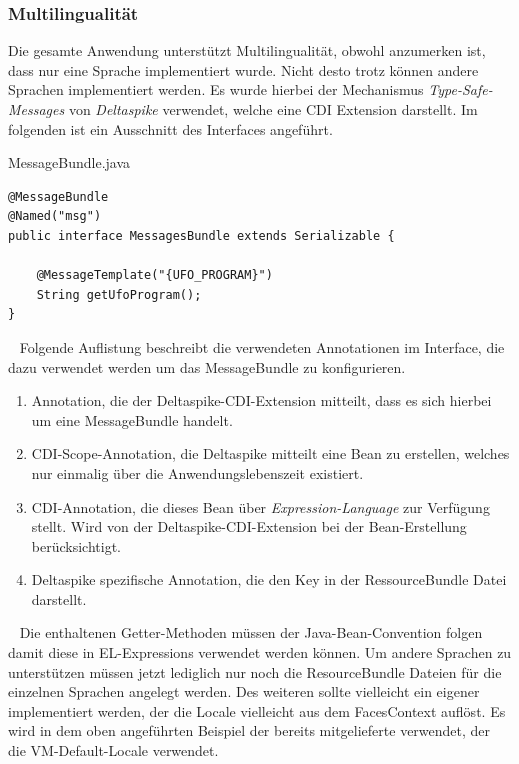 \documentclass[11pt, a4paper, twoside]{article}   	%
\begin{document}
\subsubsection{Multilingualität}
Die gesamte Anwendung unterstützt Multilingualität, obwohl anzumerken ist, dass nur eine Sprache implementiert wurde. Nicht desto trotz können andere Sprachen implementiert werden. Es wurde hierbei der Mechanismus \emph{Type-Safe-Messages} von \emph{Deltaspike} verwendet, welche eine CDI Extension darstellt. Im folgenden ist ein Ausschnitt des Interfaces  angeführt. 
\begin{listing}[H]    
\caption{MessageBundle.java}    
\begin{verbatim}
@MessageBundle
@Named("msg")
public interface MessagesBundle extends Serializable {

	@MessageTemplate("{UFO_PROGRAM}")
	String getUfoProgram();
}
\end{verbatim}
\end{listing}
\ \newline
Folgende Auflistung beschreibt die verwendeten Annotationen im Interface, die dazu verwendet werden um das MessageBundle zu konfigurieren.
\begin{enumerate}
	\item\emph{}
	\newline
	Annotation, die der Deltaspike-CDI-Extension mitteilt, dass es sich hierbei um eine MessageBundle handelt.
	\item\emph{}
	\newline
	CDI-Scope-Annotation, die Deltaspike mitteilt eine Bean zu erstellen, welches nur einmalig über die Anwendungslebenszeit existiert.
	\item\emph{}
	\newline
	CDI-Annotation, die dieses Bean über \emph{Expression-Language} zur Verfügung stellt. Wird von der Deltaspike-CDI-Extension bei der Bean-Erstellung berücksichtigt.
	\item\emph{}
	\newline
	Deltaspike spezifische Annotation, die den Key in der RessourceBundle Datei darstellt.
\end{enumerate} 
\ \newline
Die enthaltenen Getter-Methoden müssen der Java-Bean-Convention folgen damit diese in EL-Expressions verwendet werden können. Um andere Sprachen zu unterstützen müssen jetzt lediglich nur noch die ResourceBundle Dateien für die einzelnen Sprachen angelegt werden. Des weiteren sollte vielleicht ein eigener  implementiert werden, der die Locale vielleicht aus dem FacesContext auflöst. Es wird in dem oben angeführten Beispiel der bereits mitgelieferte  verwendet, der die VM-Default-Locale verwendet.
\end{document}
